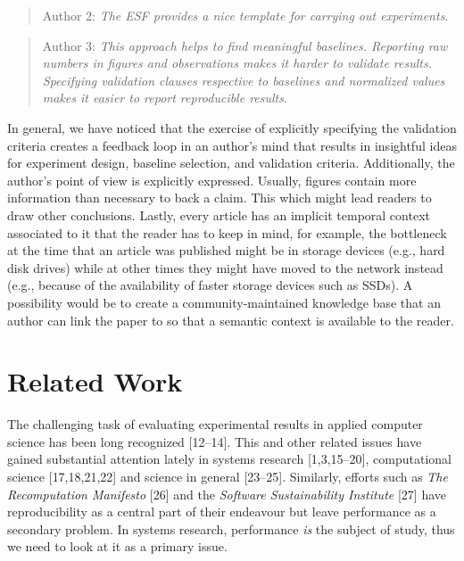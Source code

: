 \documentclass[10pt,reprint]{sigplanconf}
\begin{document}
\begin{quote}
Author 2: \emph{The ESF provides a nice template for carrying out
experiments}.
\end{quote}

\begin{quote}
Author 3: \emph{This approach helps to find meaningful baselines.
Reporting raw numbers in figures and observations makes it harder to
validate results. Specifying validation clauses respective to baselines
and normalized values makes it easier to report reproducible results}.
\end{quote}

In general, we have noticed that the exercise of explicitly specifying
the validation criteria creates a feedback loop in an author's mind that
results in insightful ideas for experiment design, baseline selection,
and validation criteria. Additionally, the author's point of view is
explicitly expressed. Usually, figures contain more information than
necessary to back a claim. This which might lead readers to draw other
conclusions. Lastly, every article has an implicit temporal context
associated to it that the reader has to keep in mind, for example, the
bottleneck at the time that an article was published might be in storage
devices (e.g., hard disk drives) while at other times they might have
moved to the network instead (e.g., because of the availability of
faster storage devices such as SSDs). A possibility would be to create a
community-maintained knowledge base that an author can link the paper to
so that a semantic context is available to the reader.

\section{Related Work}\label{sec:related}

The challenging task of evaluating experimental results in applied
computer science has been long recognized {[}12--14{]}. This and other
related issues have gained substantial attention lately in systems
research {[}1,3,15--20{]}, computational science {[}17,18,21,22{]} and
science in general {[}23--25{]}. Similarly, efforts such as \emph{The
Recomputation Manifesto} {[}26{]} and the \emph{Software Sustainability
Institute} {[}27{]} have reproducibility as a central part of their
endeavour but leave performance as a secondary problem. In systems
research, performance \emph{is} the subject of study, thus we need to
look at it as a primary issue.
\end{document}
